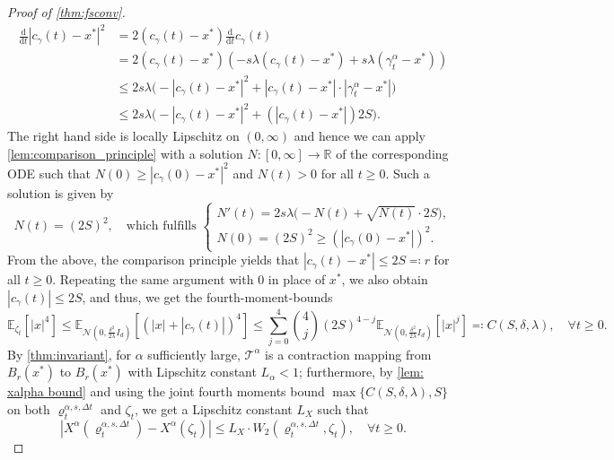 \documentclass[reqno]{amsart}
\numberwithin{algorithm}{section}
\newcommand{\diff}{\mathrm{d}}
\newcommand{\RR}{\mathbb{R}}
\newcommand{\EE}{{\mathbb E}}
\newcommand{\Xalpha}{{X^\alpha}}
\newcommand{\mc}[1]{\mathcal{#1}}
\begin{document}
{\begin{proof}[Proof of \cref{thm:fsconv}]
\begin{equation}
        \begin{split}
        \frac{\diff}{\diff t} |c_\gamma(t) - x^*|^2 &= 2(c_\gamma(t) - x^*) \frac{\diff}{\diff t} c_\gamma(t) \\
        &= 2 (c_\gamma(t) - x^*) (-s \lambda (c_\gamma(t) - x^*) + s \lambda (\gamma_t^\alpha - x^*)) \\
        &\leq 2 s \lambda \Big( - |c_\gamma(t) - x^*|^2 + |c_\gamma(t) - x^*|\cdot |\gamma_t^\alpha - x^*| \Big) \\
        &\leq 2 s \lambda \Big( - |c_\gamma(t) - x^*|^2 + (|c_\gamma(t) - x^*|) 2S \Big).
        \end{split}
    \end{equation}
    The right hand side is locally Lipschitz on $(0, \infty)$ and hence we can apply \cref{lem:comparison_principle} with a solution $N: [0, \infty] \to \RR$ of the corresponding ODE such that $N(0) \geq |c_\gamma(0) - x^*|^2$ and $N(t) > 0$ for all $t \geq 0$. Such a solution is given by
    \begin{equation*}
        N(t) = ( 2S )^2, \quad \text{which fulfills } \begin{cases} N'(t) = 2 s \lambda \Big( - N(t) + \sqrt{N(t)} \cdot 2S \Big), \\N(0) = (2S)^2 \geq (|c_\gamma(0) - x^*|)^2.
        \end{cases}
    \end{equation*}
    From the above, the comparison principle yields that $|c_\gamma(t) - x^*| \leq 2S \eqqcolon r$ for all $t \geq 0$. Repeating the same argument with $0$ in place of $x^*$, we also obtain $|c_\gamma(t)| \leq 2S$, and thus, we get the fourth-moment-bounds
    \begin{equation*}
        \EE_{\zeta_t}[|x|^4] \leq \EE_{\mc{N}(0, \frac{\delta^2}{2\lambda} I_d)}[(|x| + |c_\gamma(t)|)^4] \leq \sum_{j=0}^4 \binom{4}{j} (2S)^{4-j} \EE_{\mc{N}(0, \frac{\delta^2}{2\lambda} I_d)}[|x|^j] \eqqcolon C(S, \delta, \lambda), \quad \forall t \geq 0.
    \end{equation*}
    By \cref{thm:invariant}, for $\alpha$ sufficiently large, $\mathcal{T}^\alpha$ is a contraction mapping from $B_r(x^*)$ to $B_r(x^*)$ with Lipschitz constant $L_\alpha < 1$; furthermore, by \cref{lem: xalpha bound} and using the joint fourth moments bound $\max\{ C(S, \delta, \lambda), S \}$ on both $\varrho_t^{\alpha,s,\Delta t}$ and $\zeta_t$, we get a Lipschitz constant $L_X$ such that
    \begin{equation}\label{eq:stability_in_proof}
        |\Xalpha(\varrho_{t}^{\alpha,s,\Delta t}) - \Xalpha(\zeta_t)| \leq L_X \cdot W_2(\varrho_{t}^{\alpha,s,\Delta t}, \zeta_t), \quad \forall t \geq 0.

\end{equation}
\end{proof}}
\end{document}
